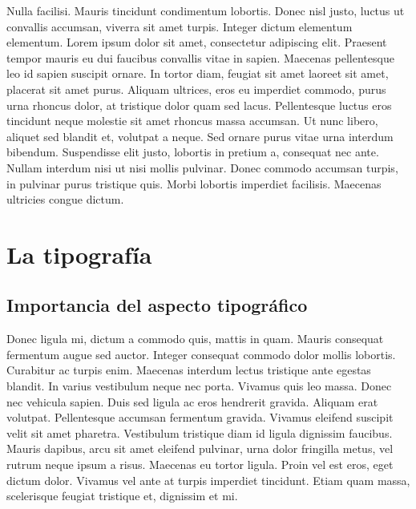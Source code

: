 \documentclass[11pt, a4paper]{report}
\begin{document}
Nulla facilisi. Mauris tincidunt condimentum lobortis. Donec nisl justo, luctus ut convallis accumsan, viverra sit amet turpis. Integer dictum elementum elementum. Lorem ipsum dolor sit amet, consectetur adipiscing elit. Praesent tempor mauris eu dui faucibus convallis vitae in sapien. Maecenas pellentesque leo id sapien suscipit ornare. In tortor diam, feugiat sit amet laoreet sit amet, placerat sit amet purus. Aliquam ultrices, eros eu imperdiet commodo, purus urna rhoncus dolor, at tristique dolor quam sed lacus. Pellentesque luctus eros tincidunt neque molestie sit amet rhoncus massa accumsan. Ut nunc libero, aliquet sed blandit et, volutpat a neque. Sed ornare purus vitae urna interdum bibendum. Suspendisse elit justo, lobortis in pretium a, consequat nec ante. Nullam interdum nisi ut nisi mollis pulvinar. Donec commodo accumsan turpis, in pulvinar purus tristique quis. Morbi lobortis imperdiet facilisis. Maecenas ultricies congue dictum.









\chapter{La tipografía}





\section{Importancia del aspecto tipográfico}

Donec ligula mi, dictum a commodo quis, mattis in quam. Mauris consequat fermentum augue sed auctor. Integer consequat commodo dolor mollis lobortis. Curabitur ac turpis enim. Maecenas interdum lectus tristique ante egestas blandit. In varius vestibulum neque nec porta. Vivamus quis leo massa. Donec nec vehicula sapien. Duis sed ligula ac eros hendrerit gravida. Aliquam erat volutpat. Pellentesque accumsan fermentum gravida. Vivamus eleifend suscipit velit sit amet pharetra. Vestibulum tristique diam id ligula dignissim faucibus. Mauris dapibus, arcu sit amet eleifend pulvinar, urna dolor fringilla metus, vel rutrum neque ipsum a risus. Maecenas eu tortor ligula. Proin vel est eros, eget dictum dolor. Vivamus vel ante at turpis imperdiet tincidunt. Etiam quam massa, scelerisque feugiat tristique et, dignissim et mi.
\end{document}

